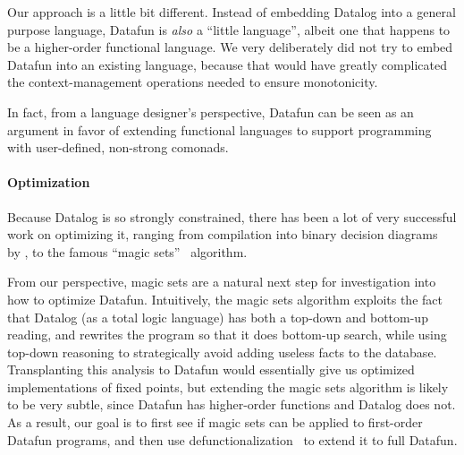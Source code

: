 Our approach is a little bit different. Instead of embedding Datalog
into a general purpose language, Datafun is \emph{also} a ``little
language'', albeit one that happens to be a higher-order
functional language. We very deliberately did not try to embed Datafun
into an existing language, because that would have greatly complicated
the context-management operations needed to ensure monotonicity.

In fact, from a language designer's perspective, Datafun can be seen
as an argument in favor of extending functional languages to support
programming with user-defined, non-strong comonads. 


\paragraph{Optimization} Because Datalog is so strongly constrained,
there has been a lot of very successful work on optimizing it, ranging
from compilation into binary decision diagrams~\cite{bdd} by
\citet{whaley-lam}, to the famous ``magic sets''~\cite{magicsets}
algorithm.

From our perspective, magic sets are a natural next step for
investigation into how to optimize Datafun. Intuitively, the magic
sets algorithm exploits the fact that Datalog (as a total logic
language) has both a top-down and bottom-up reading, and rewrites the
program so that it does bottom-up search, while using top-down
reasoning to strategically avoid adding useless facts to the
database. Transplanting this analysis to Datafun would essentially
give us optimized implementations of fixed points, but extending the
magic sets algorithm is likely to be very subtle, since Datafun has
higher-order functions and Datalog does not. As a result, our goal is
to first see if magic sets can be applied to first-order Datafun programs,
and then use defunctionalization~\cite{defunctionalization} to
extend it to full Datafun.



